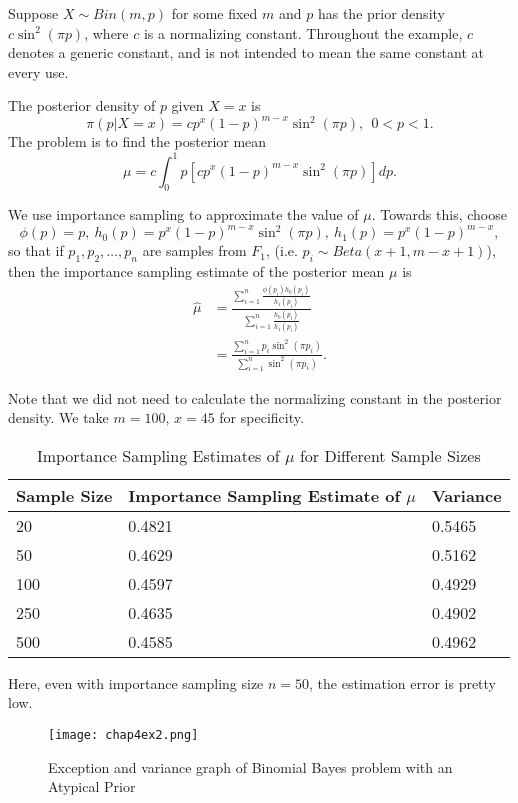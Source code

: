 \begin{example}
	\label{Binomial Bayes problem with an Atypical Prior}
	Suppose $X\sim Bin(m,p)$ for some fixed $m$ and $p$ has the prior density $c\sin^{2}(\pi p)$,
	where $c$ is a normalizing constant.
	Throughout the example, $c$ denotes a generic constant,
	and is not intended to mean the same constant at every use.

	The posterior density of $p$ given $X = x$ is
	\[
		\pi(p|X=x) = cp^{x}(1-p)^{m-x}\sin ^{2}(\pi p), \ \ 0<p<1.
	\]
	The problem is to find the posterior mean
	\[
		\mu = c \int_{0}^{1} p[cp^{x}(1-p)^{m-x}\sin ^{2}(\pi p)]dp.
	\]

	We use importance sampling to approximate the value of $\mu$. Towards this, choose
	\[
		\phi(p)=p, \ h_0(p) = p^{x} (1-p)^{m-x} \sin ^{2}(\pi p),\ h_1(p) = p^{x}(1-p)^{m-x},
	\]
	so that if $p_1,p_2,\ldots,p_n$ are samples from $F_1$, (i.e. $p_i\sim Beta(x+1, m-x+1)$),
	then the importance sampling estimate of the posterior mean $\mu$ is
	\begin{align*}
		\hat{\mu} & = \frac{\sum_{i=1}^{n}\frac{\phi(p_i)h_0(p_i)}{h_1(p_i)} }{\sum_{i=1}^{n}\frac{h_0(p_i)}{h_1(p_i)} } \\
		          & = \frac{\sum_{i=1}^{n}p_i\sin ^{2}(\pi p_i) }{\sum_{i=1}^{n} \sin ^{2}(\pi p_i) }.
	\end{align*}

	Note that we did not need to calculate the normalizing constant in the posterior density.
	We take $m=100$, $x=45$ for specificity.
	\begin{table}[H]
		\centering
		\begin{tabular}{l p{3.5cm} p{2cm}}
			\hline
			Sample Size & Importance Sampling Estimate of $\mu$ & Variance \\
			\hline
			20          & 0.4821                                & 0.5465   \\
			50          & 0.4629                                & 0.5162   \\
			100         & 0.4597                                & 0.4929   \\
			250         & 0.4635                                & 0.4902   \\
			500         & 0.4585                                & 0.4962   \\
			\hline
		\end{tabular}
		\caption{Importance Sampling Estimates of $\mu$ for Different Sample Sizes}
		\label{tab:importance-sampling-mu}
		Here, even with importance sampling size $n=50$, the estimation error is pretty low.
	\end{table}
    \begin{figure}[H]
        \centering
        \texttt{[image: chap4ex2.png]}
        \caption{Exception and variance graph of Binomial Bayes problem with an Atypical Prior}
    \end{figure}
\end{example}

